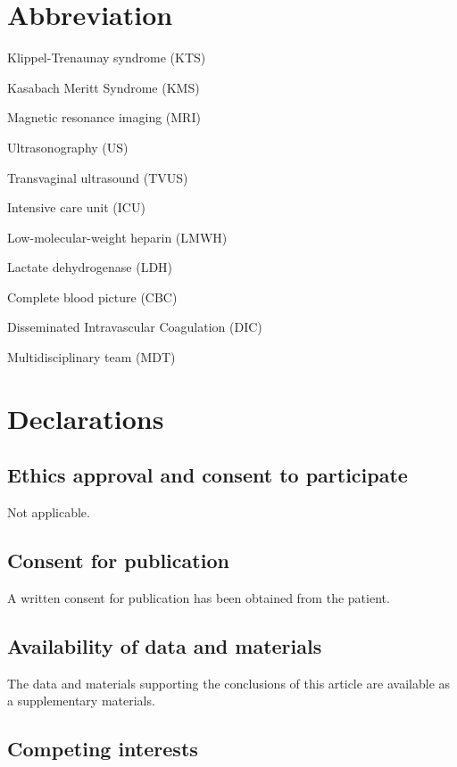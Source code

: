 \documentclass[
  letterpaper,
  DIV=11,
  numbers=noendperiod]{scrartcl}
\begin{document}
\section{Abbreviation}\label{abbreviation}

Klippel-Trenaunay syndrome (KTS)

Kasabach Meritt Syndrome (KMS)

Magnetic resonance imaging (MRI)

Ultrasonography (US)

Transvaginal ultrasound (TVUS)

Intensive care unit (ICU)

Low-molecular-weight heparin (LMWH)

Lactate dehydrogenase (LDH)

Complete blood picture (CBC)

Disseminated Intravascular Coagulation (DIC)

Multidisciplinary team (MDT)

\section{Declarations}\label{declarations}

\subsection{Ethics approval and consent to
participate}\label{ethics-approval-and-consent-to-participate}

Not applicable.

\subsection{Consent for publication}\label{consent-for-publication}

A written consent for publication has been obtained from the patient.

\subsection{Availability of data and
materials}\label{availability-of-data-and-materials}

The data and materials supporting the conclusions of this article are
available as a supplementary materials.

\subsection{Competing interests}\label{competing-interests}
\end{document}
